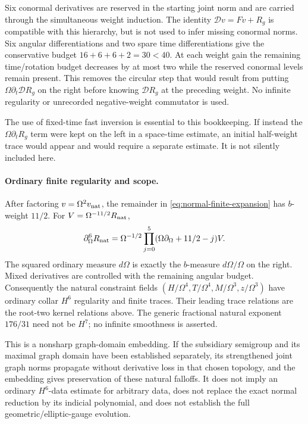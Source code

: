 Six conormal derivatives are reserved in the starting joint norm and are
carried through the simultaneous weight induction.  The identity
$\mathcal Dv=Fv+R_g$ is compatible with this hierarchy, but is not used to
infer missing conormal norms.  Six angular differentiations and two spare
time differentiations give the conservative budget
$16+6+6+2=30<40$.  At each weight gain the remaining time/rotation budget
decreases by at most two while the reserved conormal levels remain present.
This removes the circular step that would result from putting
$\Omega\partial_t\mathcal DR_g$ on the right before knowing
$\mathcal DR_g$ at the preceding weight.  No infinite regularity or
unrecorded negative-weight commutator is used.

The use of fixed-time fast inversion is essential to this bookkeeping.
If instead the $\Omega\partial_tR_g$ term were kept on the left in a
space-time estimate, an initial half-weight trace would appear and would
require a separate estimate. It is not silently included here.

\paragraph{Ordinary finite regularity and scope.}
After factoring $v=\Omega^2v_{\rm nat}$, the remainder in
\eqref{eq:normal-finite-expansion} has $b$-weight $11/2$. For
$V=\Omega^{-11/2}R_{\rm nat}$,
\[
 \partial_\Omega^6R_{\rm nat}
 =\Omega^{-1/2}\prod_{j=0}^5
       (\Omega\partial_\Omega+11/2-j)V.
\]
The squared ordinary measure $d\Omega$ is exactly the $b$-measure
$d\Omega/\Omega$ on the right. Mixed derivatives are controlled with the
remaining angular budget. Consequently the natural constraint fields
$(H/\Omega^4,T/\Omega^4,M/\Omega^3,z/\Omega^3)$ have ordinary collar
$H^6$ regularity and finite traces. Their leading trace relations are the
root-two kernel relations above. The generic fractional natural exponent
$176/31$ need not be $H^7$; no infinite smoothness is asserted.

This is a nonsharp graph-domain embedding. If the subsidiary semigroup and
its maximal graph domain have been established separately, its strengthened
joint graph norms
propagate without derivative loss in that chosen topology, and the embedding
gives preservation of these natural falloffs. It does not imply an ordinary
$H^6$-data estimate for arbitrary data, does not replace the exact normal
reduction by its indicial polynomial, and does not establish the full
geometric/elliptic-gauge evolution.

